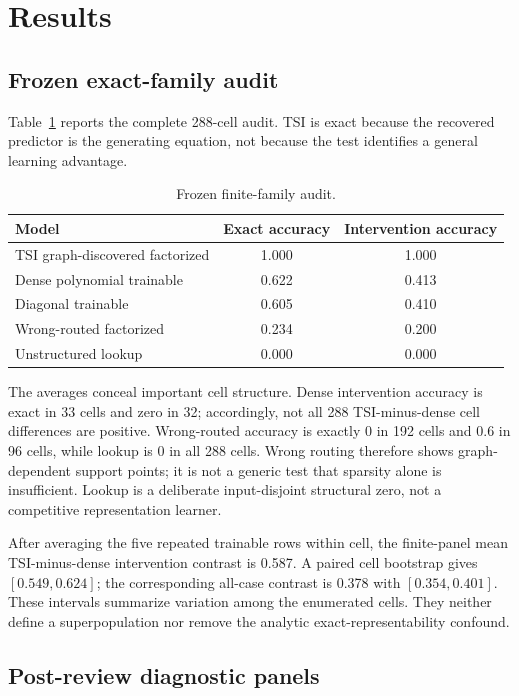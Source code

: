 \section{Results}

\subsection{Frozen exact-family audit}

Table~\ref{tab:main} reports the complete 288-cell audit.  TSI is exact because
the recovered predictor is the generating equation, not because the test
identifies a general learning advantage.

\begin{table}[ht]
\centering
\caption{Frozen finite-family audit.}
\label{tab:main}
\begin{tabular}{lcc}
\toprule
Model & Exact accuracy & Intervention accuracy\\
\midrule
TSI graph-discovered factorized & 1.000 & 1.000\\
Dense polynomial trainable & 0.622 & 0.413\\
Diagonal trainable & 0.605 & 0.410\\
Wrong-routed factorized & 0.234 & 0.200\\
Unstructured lookup & 0.000 & 0.000\\
\bottomrule
\end{tabular}
\end{table}

The averages conceal important cell structure.  Dense intervention accuracy is
exact in 33 cells and zero in 32; accordingly, not all 288 TSI-minus-dense cell
differences are positive.  Wrong-routed accuracy is exactly 0 in 192 cells and
0.6 in 96 cells, while lookup is 0 in all 288 cells.  Wrong routing therefore
shows graph-dependent support points; it is not a generic test that sparsity
alone is insufficient.  Lookup is a deliberate input-disjoint structural zero,
not a competitive representation learner.

After averaging the five repeated trainable rows within cell, the finite-panel
mean TSI-minus-dense intervention contrast is 0.587.  A paired cell bootstrap
gives \([0.549,0.624]\); the corresponding all-case contrast is 0.378 with
\([0.354,0.401]\).  These intervals summarize variation among the enumerated
cells.  They neither define a superpopulation nor remove the analytic
exact-representability confound.

\subsection{Post-review diagnostic panels}

